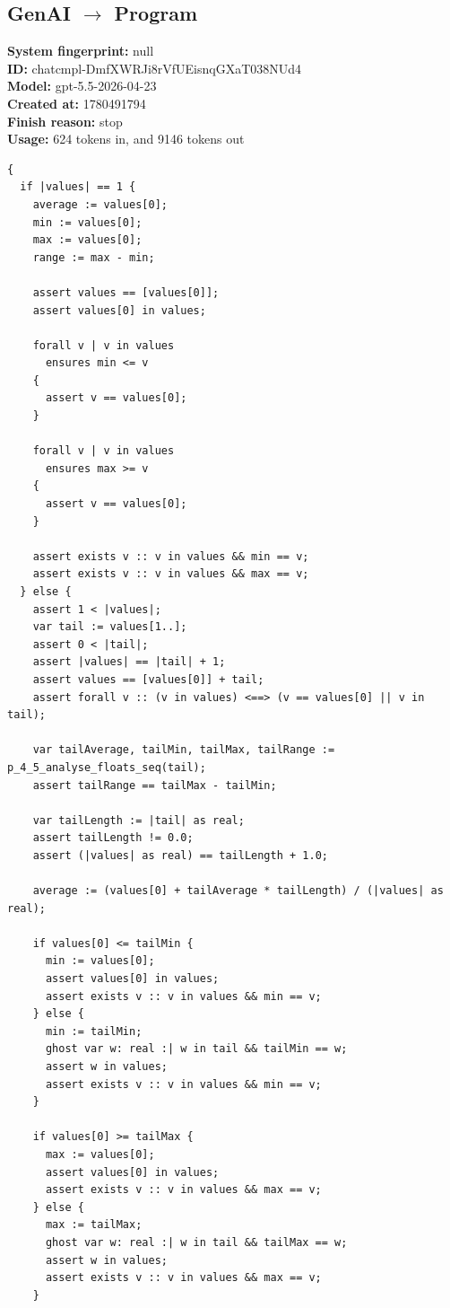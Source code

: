\documentclass{article}
\begin{document}
\subsection*{GenAI $\rightarrow$ Program}
\textbf{System fingerprint: }null
\\\textbf{ID: }chatcmpl-DmfXWRJi8rVfUEisnqGXaT038NUd4
\\\textbf{Model: }gpt-5.5-2026-04-23
\\\textbf{Created at: }1780491794
\\\textbf{Finish reason: }stop
\\\textbf{Usage: }624 tokens in, and 9146 tokens out
\begin{lstlisting}
{
  if |values| == 1 {
    average := values[0];
    min := values[0];
    max := values[0];
    range := max - min;

    assert values == [values[0]];
    assert values[0] in values;

    forall v | v in values
      ensures min <= v
    {
      assert v == values[0];
    }

    forall v | v in values
      ensures max >= v
    {
      assert v == values[0];
    }

    assert exists v :: v in values && min == v;
    assert exists v :: v in values && max == v;
  } else {
    assert 1 < |values|;
    var tail := values[1..];
    assert 0 < |tail|;
    assert |values| == |tail| + 1;
    assert values == [values[0]] + tail;
    assert forall v :: (v in values) <==> (v == values[0] || v in tail);

    var tailAverage, tailMin, tailMax, tailRange := p_4_5_analyse_floats_seq(tail);
    assert tailRange == tailMax - tailMin;

    var tailLength := |tail| as real;
    assert tailLength != 0.0;
    assert (|values| as real) == tailLength + 1.0;

    average := (values[0] + tailAverage * tailLength) / (|values| as real);

    if values[0] <= tailMin {
      min := values[0];
      assert values[0] in values;
      assert exists v :: v in values && min == v;
    } else {
      min := tailMin;
      ghost var w: real :| w in tail && tailMin == w;
      assert w in values;
      assert exists v :: v in values && min == v;
    }

    if values[0] >= tailMax {
      max := values[0];
      assert values[0] in values;
      assert exists v :: v in values && max == v;
    } else {
      max := tailMax;
      ghost var w: real :| w in tail && tailMax == w;
      assert w in values;
      assert exists v :: v in values && max == v;
    }


\end{lstlisting}
\end{document}
